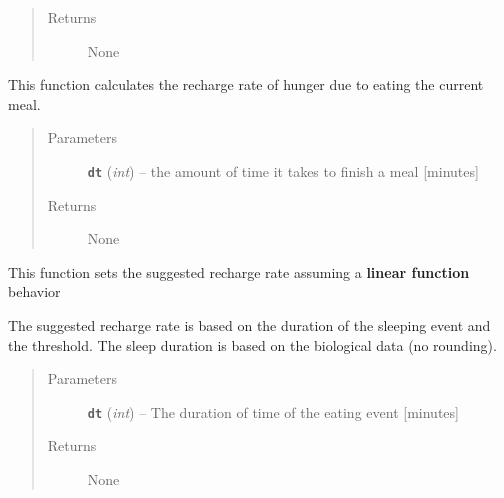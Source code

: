 \documentclass[letterpaper,10pt,english]{sphinxmanual}
\begin{document}
\begin{fulllineitems}
\begin{fulllineitems}
\begin{quote}
\begin{description}
\item[{Returns}] \leavevmode
None

\end{description}\end{quote}

\end{fulllineitems}


\begin{fulllineitems}
\label{hunger:hunger.Hunger.set_recharge_rate}
This function calculates the recharge rate of hunger due to eating the current meal.
\begin{quote}\begin{description}
\item[{Parameters}] \leavevmode
\textbf{\texttt{dt}} (\emph{int}) -- the amount of time it takes to finish a meal {[}minutes{]}

\item[{Returns}] \leavevmode
None

\end{description}\end{quote}

\end{fulllineitems}


\begin{fulllineitems}
\label{hunger:hunger.Hunger.set_suggested_recharge_rate}
This function sets the suggested recharge rate assuming a \textbf{linear function} behavior

The suggested recharge rate is based on the duration of the sleeping event         and the threshold. The sleep duration is based on the biological data (no rounding).
\begin{quote}\begin{description}
\item[{Parameters}] \leavevmode
\textbf{\texttt{dt}} (\emph{int}) -- The duration of time of the eating event {[}minutes{]}

\item[{Returns}] \leavevmode
None

\end{description}\end{quote}


\end{fulllineitems}
\end{fulllineitems}
\end{document}
